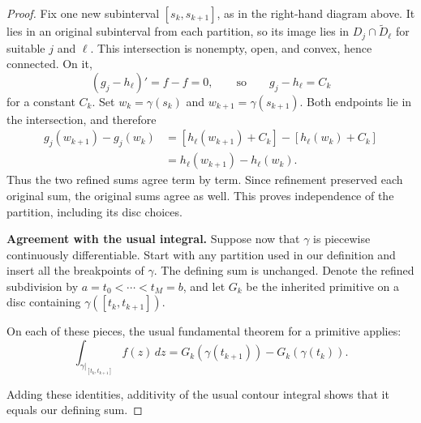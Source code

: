 \documentclass[11pt]{article}
\theoremstyle{plain}
\theoremstyle{definition}
\theoremstyle{remark}
\numberwithin{equation}{section}
\begin{document}
\begin{proof}
Fix one new subinterval $[s_k,s_{k+1}]$, as in the right-hand diagram
above. It lies in an original
subinterval from each partition, so its image lies in
$D_j\cap\widetilde D_\ell$ for suitable $j$ and $\ell$. This
intersection is nonempty, open, and convex, hence connected. On it,
\[
 (g_j-h_\ell)'=f-f=0,
 \qquad\text{so}\qquad g_j-h_\ell=C_k
\]
for a constant $C_k$. Set $w_k=\gamma(s_k)$ and
$w_{k+1}=\gamma(s_{k+1})$. Both endpoints lie in the intersection,
and therefore
\begin{align*}
 g_j(w_{k+1})-g_j(w_k)
 &=[h_\ell(w_{k+1})+C_k]-[h_\ell(w_k)+C_k]\\
 &=h_\ell(w_{k+1})-h_\ell(w_k).
\end{align*}
Thus the two refined sums agree term by term. Since refinement
preserved each original sum, the original sums agree as well. This
proves independence of the partition, including its disc choices.

\textbf{Agreement with the usual integral.}
Suppose now that $\gamma$ is piecewise continuously differentiable.
Start with any partition used in our definition and insert all the
breakpoints of $\gamma$. The defining sum is unchanged. Denote the
refined subdivision by $a=t_0<\cdots<t_M=b$, and let $G_k$ be the
inherited primitive on a disc containing $\gamma([t_k,t_{k+1}])$.

On each of these pieces, the usual fundamental theorem for a
primitive applies:
\[
 \int_{\gamma|_{[t_k,t_{k+1}]}} f(z)\,dz
 =G_k(\gamma(t_{k+1}))-G_k(\gamma(t_k)).
\]
\begin{center}
\end{center}
Adding these identities, additivity of the usual contour integral
shows that it equals our defining sum.
\end{proof}
\end{document}
